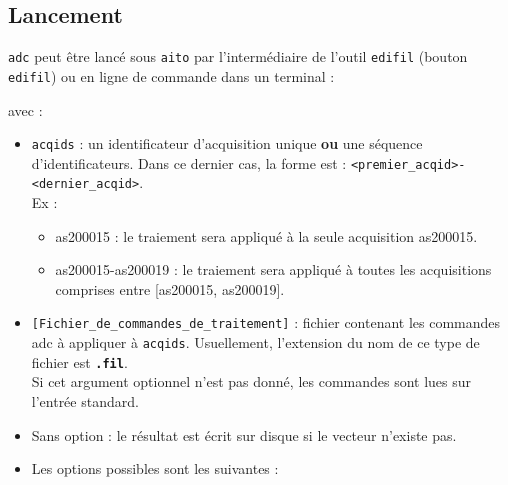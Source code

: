 \subsection{Lancement}
\texttt{adc} peut être lancé sous \texttt{aito} par l'intermédiaire de l'outil
\texttt{edifil} (bouton \texttt{edifil})
ou en ligne de commande dans un terminal :


\medbreak
avec : \\
\begin{itemize}
  \item[•] \texttt{acqids} : un identificateur d'acquisition unique
    \textbf{ou} une séquence d'identificateurs. Dans ce dernier cas, la
    forme est : \texttt{<premier\_acqid>-<dernier\_acqid>}. \\
    Ex :
    \begin{itemize}
      \item as200015 : le traiement sera appliqué à la seule acquisition as200015.
      \item as200015-as200019 : le traiement sera appliqué à toutes les
            acquisitions comprises entre [as200015, as200019].
    \end{itemize}

  \item[•] \texttt{[Fichier\_de\_commandes\_de\_traitement]} : fichier
    contenant les commandes adc à appliquer à \texttt{acqids}.
    Usuellement, l'extension du nom de ce type de fichier est
    \texttt{\textbf{.fil}}. \\
    Si cet argument optionnel n'est pas donné, les commandes sont lues sur
    l'entrée standard.

  \item[•] Sans option : le résultat est écrit sur disque si
    le vecteur n'existe pas.

  \item[•] Les options possibles sont les suivantes :
\end{itemize}
